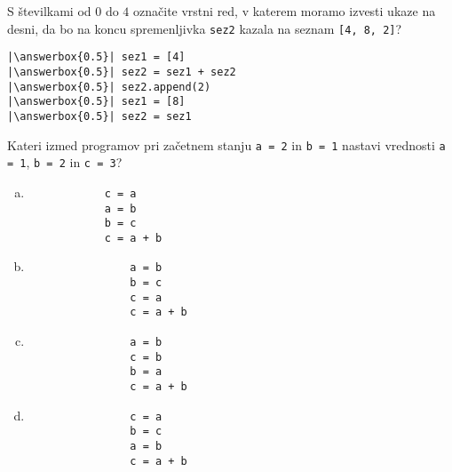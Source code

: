 \documentclass[arhiv, 10pt]{../izpit}
\newcommand{\inlinepy}[1]{\texttt{#1}}
\newcommand{\answerbox}[1]{\framebox{\vphantom{\large M}\hspace{#1cm}}}
\begin{document}
        \naloga*
        \begin{multicols}{2}
        \noindent 
        S številkami od $0$ do $4$ označite vrstni red, v katerem moramo izvesti ukaze na desni, da bo na koncu spremenljivka \inlinepy{sez2} kazala na seznam \inlinepy{[4, 8, 2]}?
    
        \columnbreak
        \noindent
        \begin{verbatim}
|\answerbox{0.5}| sez1 = [4]
|\answerbox{0.5}| sez2 = sez1 + sez2
|\answerbox{0.5}| sez2.append(2)
|\answerbox{0.5}| sez1 = [8]
|\answerbox{0.5}| sez2 = sez1

        \end{verbatim}
        \end{multicols}
    
            
        \naloga*
        
        Kateri izmed programov pri začetnem stanju
            \inlinepy{a = 2} in
            \inlinepy{b = 1}
        nastavi vrednosti
            \inlinepy{a = 1},
            \inlinepy{b = 2} in
            \inlinepy{c = 3}?
    
        \begin{multicols}{4}
        \begin{enumerate}[(a)]
\item 
            \begin{verbatim}
            c = a
            a = b
            b = c
            c = a + b
            \end{verbatim}
        
\item 
                \begin{verbatim}
                a = b
                b = c
                c = a
                c = a + b
                \end{verbatim}
            
\item 
                \begin{verbatim}
                a = b
                c = b
                b = a
                c = a + b
                \end{verbatim}
            
\item 
                \begin{verbatim}
                c = a
                b = c
                a = b
                c = a + b
                \end{verbatim}
            
\end{enumerate}

        \end{multicols}
    
\end{document}
